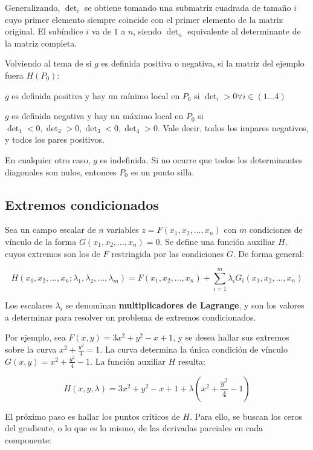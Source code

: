 \documentclass{article}
\begin{document}
Generalizando, $\det_i$ se obtiene tomando una submatriz cuadrada de tamaño $i$ cuyo primer elemento siempre coincide con el primer elemento de la matriz original. El subíndice $i$ va de $1$ a $n$, siendo $\det_n$ equivalente al determinante de la matriz completa.

Volviendo al tema de si $g$ es definida positiva o negativa, si la matriz del ejemplo fuera $H(P_0)$:

$g$ es definida positiva y hay un mínimo local en $P_0$ si $\det_i > 0 \forall i \in (1 \ldots 4)$

$g$ es definida negativa y hay un máximo local en $P_0$ si $\det_1 < 0, \det_2 > 0, \det_3 < 0, \det_4 > 0$. Vale decir, todos los impares negativos, y todos los pares positivos.

En cualquier otro caso, $g$ es indefinida. Si no ocurre que todos los determinantes diagonales son nulos, entonces $P_0$ es un punto silla.

\subsection{Extremos condicionados}

Sea un campo escalar de $n$ variables $z = F(x_1, x_2, \ldots, x_n)$ con $m$ condiciones de vínculo de la forma $G(x_1, x_2, \ldots, x_n) = 0$. Se define una función auxiliar $H$, cuyos extremos son los de $F$ restringida por las condiciones $G$. De forma general:

\begin{equation}
H(x_1, x_2, \ldots, x_n; \lambda_1, \lambda_2, \ldots, \lambda_m) = F(x_1, x_2, \ldots, x_n) + \sum\limits_{i=1}^m \lambda_i G_i(x_1, x_2, \ldots, x_n) 
\end{equation}

Los escalares $\lambda_i$ se denominan \textbf{multiplicadores de Lagrange}, y son los valores a determinar para resolver un problema de extremos condicionados.

Por ejemplo, sea $F(x,y) = 3 x^2 + y^2 - x + 1$, y se desea hallar sus extremos sobre la curva $x^2 + \frac{y^2}{4} = 1$. La curva determina la única condición de vínculo $G(x,y) = x^2 + \frac{y^2}{4} - 1$. La función auxiliar $H$ resulta:

\begin{equation}
H(x, y, \lambda) = 3 x^2 + y^2 - x + 1 + \lambda \left( x^2 + \frac{y^2}{4} - 1 \right)
\end{equation}

El próximo paso es hallar los puntos críticos de $H$. Para ello, se buscan los ceros del gradiente, o lo que es lo mismo, de las derivadas parciales en cada componente:
\end{document}
